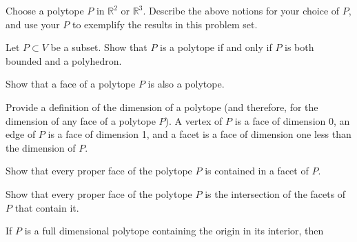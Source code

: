 \documentclass{exam}
\newcommand{\rr}{\mathbb{R}}
\begin{document}
  \begin{questions}
    \question Choose a polytope $P$ in $\rr^2$ or $\rr^3$.  Describe the above notions for your
    choice of $P$, and use your $P$ to exemplify the results in this problem set.
    
    \question Let $P \subset V$ be a subset.  Show that $P$ is a polytope if and only if
    $P$ is both bounded and a polyhedron.

    \question Show that a face of a polytope $P$ is also a polytope.
    
    \question Provide a definition of the dimension of a polytope (and therefore, for the dimension
    of any face of a polytope $P$).
    A vertex of $P$ is a face of dimension 0, an edge of $P$ is a face of dimension 1, and a facet
    is a face of dimension one less than the dimension of $P$.
    
    \question Show that every proper face of the polytope $P$ is contained in a facet of $P$.

    \question Show that every proper face of the polytope $P$ is the intersection of the facets of $P$
    that contain it.

    \question If $P$ is a full dimensional polytope containing the origin in its interior, then


\end{questions}
\end{document}
